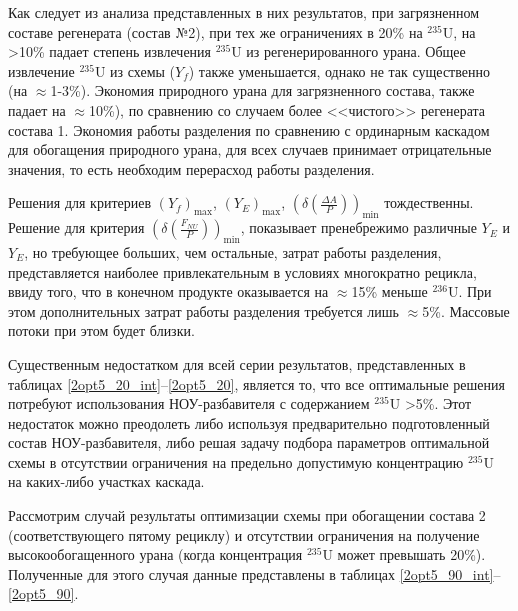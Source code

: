 Как следует из анализа представленных в них результатов, при загрязненном составе регенерата (состав №2), при тех же ограничениях в 20\% на $^{235}$U, на >10\% падает степень извлечения $^{235}$U из регенерированного урана. Общее извлечение  $^{235}$U из схемы ($Y_f$) также уменьшается, однако не так существенно (на $\approx$1-3\%). Экономия природного урана для загрязненного состава, также падает на $\approx$10\%), по сравнению со случаем более <<чистого>> регенерата состава 1. Экономия работы разделения по сравнению с ординарным каскадом для обогащения природного урана, для всех случаев принимает отрицательные значения, то есть необходим перерасход работы разделения.

Решения для критериев $(Y_f)_\text{max}$, $(Y_{E})_\text{max}$, $(\delta(\frac{\Delta A}{P}))_\text{min}$ тождественны. Решение для критерия $(\delta(\frac{F_{NU}}{P}))_\text{min}$, показывает пренебрежимо различные $Y_{E}$ и $Y_{E}$, но требующее больших, чем остальные, затрат работы разделения, представляется наиболее привлекательным в условиях многократно рецикла, ввиду того, что в конечном продукте оказывается на $\approx$15\% меньше $^{236}$U. При этом дополнительных затрат работы разделения требуется лишь $\approx$5\%. Массовые потоки при этом будет близки.

Существенным недостатком для всей серии результатов, представленных в таблицах \ref*{2opt5_20_int}--\ref*{2opt5_20}, является то, что все оптимальные решения потребуют использования НОУ-разбавителя с содержанием $^{235}$U >5\%. Этот недостаток можно преодолеть либо используя предварительно подготовленный состав НОУ-разбавителя, либо решая задачу подбора параметров оптимальной схемы в отсутствии ограничения на предельно допустимую концентрацию $^{235}$U на каких-либо участках каскада.

Рассмотрим случай результаты оптимизации схемы при обогащении состава 2 (соответствующего пятому рециклу) и отсутствии ограничения на получение высокообогащенного урана (когда концентрация $^{235}$U может превышать 20\%). Полученные для этого случая данные представлены в таблицах \ref*{2opt5_90_int}--\ref*{2opt5_90}.

